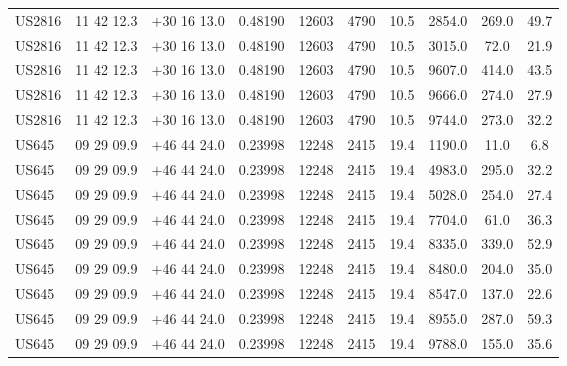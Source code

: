\begin{landscape}
\begin{center}
\begin{longtable}{l c c c c c c c c c}
US2816  &                  11 42 12.3  &         $+$30 16 13.0  &       0.48190  & 12603  &   4790  &       10.5  &      2854.0  &  269.0  &  49.7  \\
US2816  &                  11 42 12.3  &         $+$30 16 13.0  &       0.48190  & 12603  &   4790  &       10.5  &      3015.0  &  72.0  &   21.9  \\
US2816  &                  11 42 12.3  &         $+$30 16 13.0  &       0.48190  & 12603  &   4790  &       10.5  &      9607.0  &  414.0  &  43.5  \\
US2816  &                  11 42 12.3  &         $+$30 16 13.0  &       0.48190  & 12603  &   4790  &       10.5  &      9666.0  &  274.0  &  27.9  \\
US2816  &                  11 42 12.3  &         $+$30 16 13.0  &       0.48190  & 12603  &   4790  &       10.5  &      9744.0  &  273.0  &  32.2  \\
US645  &                   09 29 09.9  &         $+$46 44 24.0  &       0.23998  & 12248  &   2415  &       19.4  &      1190.0  &  11.0  &   6.8  \\
US645  &                   09 29 09.9  &         $+$46 44 24.0  &       0.23998  & 12248  &   2415  &       19.4  &      4983.0  &  295.0  &  32.2  \\
US645  &                   09 29 09.9  &         $+$46 44 24.0  &       0.23998  & 12248  &   2415  &       19.4  &      5028.0  &  254.0  &  27.4  \\
US645  &                   09 29 09.9  &         $+$46 44 24.0  &       0.23998  & 12248  &   2415  &       19.4  &      7704.0  &  61.0  &   36.3  \\
US645  &                   09 29 09.9  &         $+$46 44 24.0  &       0.23998  & 12248  &   2415  &       19.4  &      8335.0  &  339.0  &  52.9  \\
US645  &                   09 29 09.9  &         $+$46 44 24.0  &       0.23998  & 12248  &   2415  &       19.4  &      8480.0  &  204.0  &  35.0  \\
US645  &                   09 29 09.9  &         $+$46 44 24.0  &       0.23998  & 12248  &   2415  &       19.4  &      8547.0  &  137.0  &  22.6  \\
US645  &                   09 29 09.9  &         $+$46 44 24.0  &       0.23998  & 12248  &   2415  &       19.4  &      8955.0  &  287.0  &  59.3  \\
US645  &                   09 29 09.9  &         $+$46 44 24.0  &       0.23998  & 12248  &   2415  &       19.4  &      9788.0  &  155.0  &  35.6  \\

\end{longtable}
\end{center}
\end{landscape}

